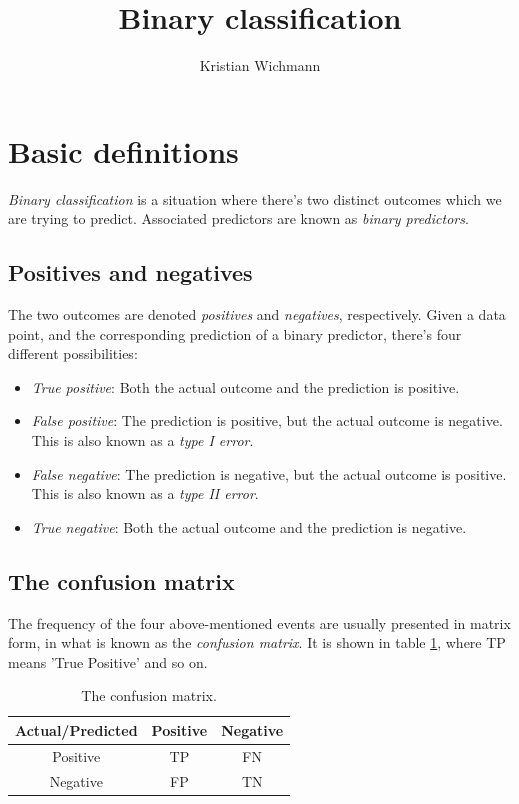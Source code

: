 \documentclass[12pt,a4paper]{article}
\title{Binary classification}
\author{Kristian Wichmann}
\numberwithin{equation}{section}
\begin{document}
\maketitle

\section{Basic definitions}
\textit{Binary classification} is a situation where there's two distinct outcomes which we are trying to predict. Associated predictors are known as \textit{binary predictors}.

\subsection{Positives and negatives}
The two outcomes are denoted \textit{positives} and \textit{negatives}, respectively. Given a data point, and the corresponding prediction of a binary predictor, there's four different possibilities:
\begin{itemize}
\item\textit{True positive}: Both the actual outcome and the prediction is positive.
\item\textit{False positive}: The prediction is positive, but the actual outcome is negative. This is also known as a \textit{type I error}. 
\item\textit{False negative}: The prediction is negative, but the actual outcome is positive. This is also known as a \textit{type II error}. 
\item\textit{True negative}: Both the actual outcome and the prediction is negative.
\end{itemize}

\subsection{The confusion matrix}
The frequency of the four above-mentioned events are usually presented in matrix form, in what is known as the \textit{confusion matrix}. It is shown in table \ref{table:confusion_matrix}, where TP means 'True Positive' and so on.

\begin{table}
\centering
\label{table:confusion_matrix}
\begin{tabular}{c|c|c|}
\cline{2-3}
\multicolumn{1}{l|}{Actual/Predicted} & Positive & Negative \\ \hline
\multicolumn{1}{|c|}{Positive}        & TP       & FN       \\ \hline
\multicolumn{1}{|c|}{Negative}        & FP       & TN       \\ \hline
\end{tabular}
\caption{The confusion matrix.}
\end{table}
\end{document}
